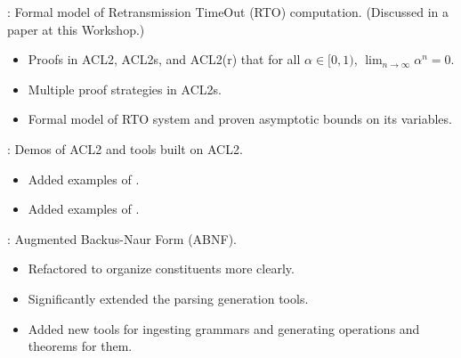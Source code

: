 
\begin{frame}

\newlibtitle

:
Formal model of Retransmission TimeOut (RTO) computation.
(Discussed in a paper at this Workshop.)
\begin{itemize}
\item Proofs in ACL2, ACL2s, and ACL2(r) that for all $\alpha \in [0, 1)$,
      $\lim_{n\to\infty}\alpha^n = 0$.
\item Multiple proof strategies in ACL2s.
\item Formal model of RTO system and proven asymptotic bounds on its variables.
\end{itemize}

\end{frame}


\begin{frame}

\implibtitle

:
Demos of ACL2 and tools built on ACL2.
\begin{itemize}
\item Added examples of .
\item Added examples of .
\end{itemize}
\end{frame}


\begin{frame}

\implibtitle

:
Augmented Backus-Naur Form (ABNF).
\begin{itemize}
\item Refactored to organize constituents more clearly.
\item Significantly extended the parsing generation tools.
\item Added new tools for ingesting grammars
      and generating operations and theorems for them.
\end{itemize}

\end{frame}

